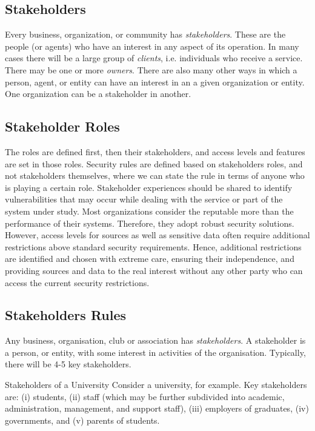 \subsection{Stakeholders}

Every business, organization, or community has {\em stakeholders}. These are the people (or agents) who have
an interest in any aspect of its operation. In many cases there will be a large group of {\em clients}, i.e. 
individuals who receive a service. There may be one or more {\em owners}. There are also many other ways
in which a person, agent, or entity can have an interest in an a given organization or entity. One organization
can be a stakeholder in another.

\subsection{Stakeholder Roles}\label{strol}
The roles are defined first, then their stakeholders, and access levels and features are set in those roles. Security rules are defined based on stakeholders roles, and not stakeholders themselves, where we can state the rule in terms of anyone who is playing a certain role. Stakeholder experiences should be shared to identify vulnerabilities that may occur while dealing with the service or part of the system under study. Most organizations consider the reputable more than the performance of their systems. Therefore, they adopt robust security solutions. However, access levels for sources as well as sensitive data often require additional restrictions above standard security requirements. Hence,  additional restrictions are identified and chosen with extreme care, ensuring their independence, and providing sources and data to the real interest without any other party who can access the current security restrictions.
\subsection{Stakeholders Rules}

Any business, organisation, club or association has {\em stakeholders}. A stakeholder is a person, or 
entity, with some interest in activities of the organisation. Typically, there will be 4-5 key stakeholders.

\begin{sbexample}{Stakeholders of a University}%
Consider a university, for example. Key stakeholders are: (i) students, (ii) staff (which may be further
subdivided into academic, administration, management, and support staff), (iii) employers of graduates,
(iv) governments, and (v) parents of students.
\end{sbexample}

